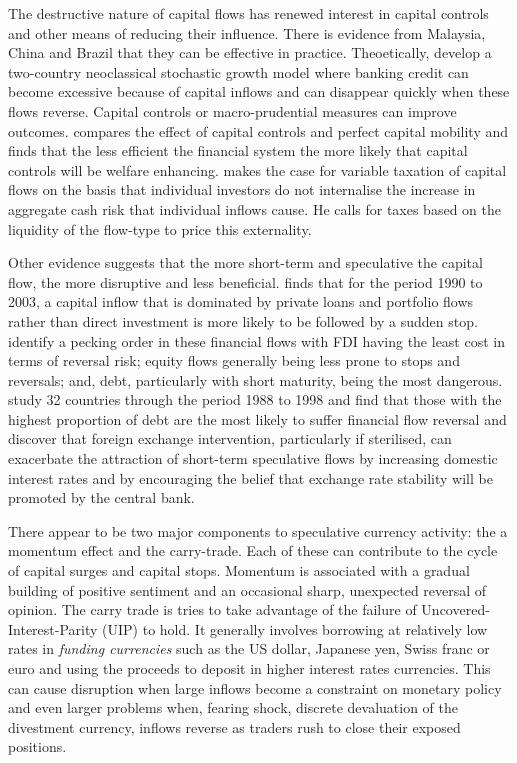 \documentclass[12pt, a4paper, oneside]{article}\usepackage[]{graphicx}\usepackage[]{color}
\begin{document}
The destructive nature of capital flows has renewed interest in capital controls and other means of reducing their influence.  There is evidence from Malaysia, China and Brazil that they can be effective in practice.  Theoetically, \citet{brunnermeier2014international} develop a two-country neoclassical stochastic growth model where banking credit can become excessive because of capital inflows and can disappear quickly when these flows reverse.  Capital controls or macro-prudential measures can improve outcomes. \citet{KatanoCapital} compares the effect of capital controls and perfect capital mobility and finds that the less efficient the financial system the more likely that capital controls will be welfare enhancing. \citet{Korinek2011} makes the case for variable taxation of capital flows on the basis that individual investors do not internalise the increase in aggregate cash risk that individual inflows cause.  He calls for taxes based on the liquidity of the flow-type to price this externality.   

Other evidence suggests that the more short-term and speculative the capital flow, the more disruptive and less beneficial.  \citet{Ozan} finds that for the period 1990 to 2003, a capital inflow that is dominated by private loans and portfolio flows rather than direct investment is more likely to be followed by a sudden stop.   \citet{RazinCap} identify a pecking order in these financial flows with FDI having the least cost in terms of reversal risk; equity flows generally being less prone to stops and reversals; and, debt, particularly with short maturity, being the most dangerous. \citet{RodrickVelasco} study 32 countries through the period 1988 to 1998 and find that those with the highest proportion of debt are the most likely to suffer financial flow reversal and \citet{MontielReinhart} discover that foreign exchange intervention, particularly if sterilised,  can exacerbate the attraction of short-term speculative flows by increasing domestic interest rates and by encouraging the belief that exchange rate stability will be promoted by the central bank.    

There appear to be two major components to speculative currency activity: the a momentum effect and the carry-trade. Each of these can contribute to the cycle of capital surges and capital stops.  Momentum is associated with a gradual building of positive sentiment and an occasional sharp, unexpected reversal of opinion.  The carry trade is tries to take advantage of the failure of Uncovered-Interest-Parity (UIP) to hold.  It generally involves borrowing at relatively low rates in \emph{funding currencies} such as the US dollar, Japanese yen, Swiss franc or euro and using the proceeds to deposit in higher interest rates currencies.  This can cause disruption when large inflows become a constraint on monetary policy and even larger problems when, fearing shock, discrete devaluation of the divestment currency, inflows reverse as traders rush to close their exposed positions. 
\end{document}
